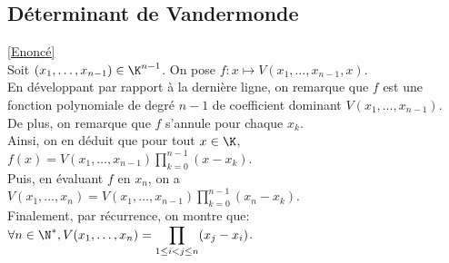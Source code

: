 \documentclass[8pt]{book}
\begin{document}
	\subsection{Déterminant de Vandermonde}
	\label{Déterminant de Vandermonde corrigé}
	\textcolor{blue}{\hyperref[Déterminant de Vandermonde]{[Enoncé]}}\\
	Soit $(x_1,\dots,x_{n-1})\in\K^{n-1}$.
	On pose $f:x\mapsto V(x_1,\dots,x_{n-1},x)$.
	\\En développant par rapport à la dernière ligne, on remarque que $f$ est une fonction polynomiale de degré $n-1$ de coefficient dominant $V(x_1,\dots,x_{n-1})$.
	\\De plus, on remarque que $f$ s'annule pour chaque $x_k$.
	\\Ainsi, on en déduit que pour tout $x\in\K$, $f(x)=V(x_1,\dots,x_{n-1})\displaystyle\prod_{k=0}^{n-1}(x-x_k)$.
	\\Puis, en évaluant $f$ en $x_n$, on a $V(x_1,\dots,x_n)=V(x_1,\dots,x_{n-1})\displaystyle\prod_{k=0}^{n-1}(x_n-x_k)$.
	\\Finalement, par récurrence, on montre que: $\forall n\in\N^*,V(x_1,\dots,x_n)=\displaystyle\prod_{1\leq i<j\leq n}(x_j-x_i)$.
	
\end{document}
